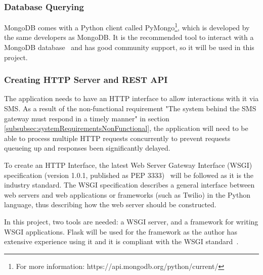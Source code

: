 \documentclass[authoryearcitations]{UoYCSproject}
\begin{document}
\subsubsection{Database Querying}
MongoDB comes with a Python client called PyMongo\footnote{For more information: https://api.mongodb.org/python/current/}, which is developed by the same developers as MongoDB.  It is the recommended tool to interact with a MongoDB database~\cite{pyMongoDoc} and has good community support, so it will be used in this project.

\subsubsection{Creating HTTP Server and REST API}
The application needs to have an HTTP interface to allow interactions with it via SMS.  As a result of the non-functional requirement "The system behind the SMS gateway must respond in a timely manner" in section \ref{subsubsec:systemRequirementsNonFunctional}, the application will need to be able to process multiple HTTP requests concurrently to prevent requests queueing up and responses been significantly delayed.

To create an HTTP Interface, the latest Web Server Gateway Interface (WSGI) specification (version 1.0.1, published as PEP 3333)~\cite{eby2010python} will be followed as it is the industry standard. The WSGI specification describes a general interface between web servers and web applications or frameworks (such as Twilio) in the Python language, thus describing how the web server should be constructed.

In this project, two tools are needed: a WSGI server, and a framework for writing WSGI applications. Flask will be used for the framework as the author has extensive experience using it and it is compliant with the WSGI standard~\cite{libraryFlask}.
\end{document}
